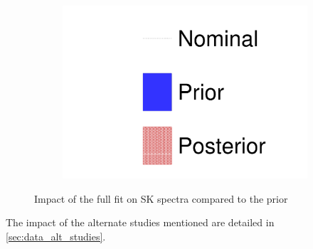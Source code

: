 \begin{figure}[h]
\begin{subfigure}[t]{0.32\textwidth}
		\includegraphics[width=\textwidth, trim={0mm 0mm 0mm 0mm}, clip, page=4]{figures/mach3/data/prior_error_1june_try_2017_fit_on_sk_spectra}
	\end{subfigure}
	
	\caption{Impact of the full fit on SK spectra compared to the prior}
	\label{fig:sk_2017}
\end{figure}

The impact of the alternate studies mentioned are detailed in \autoref{sec:data_alt_studies}.
\clearpage
